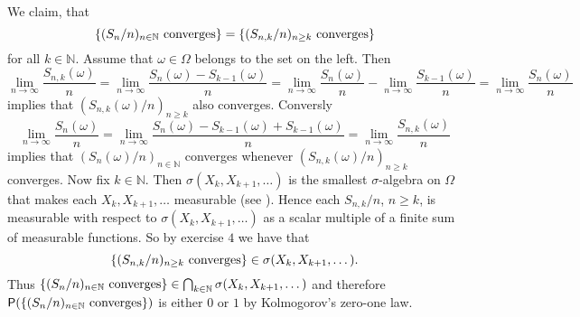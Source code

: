 \begin{enumerate}[label = \textbf{Exercise \arabic*.},wide = 0pt, itemsep=1.5ex]
		We claim, that
		\begin{equation}
			\cbr[0]{(S_n/n)_{n \in \mathbb{N}} \text{ converges}} = \cbr[0]{(S_{n,k}/n)_{n \geq k} \text{ converges}}
		\end{equation}
		\noindent for all $k \in \mathbb{N}$. Assume that $\omega \in \Omega$ belongs to the set on the left. Then
		\begin{equation}
			\lim_{n \to \infty}\frac{S_{n,k}(\omega)}{n} = \lim_{n \to \infty}\frac{S_n(\omega) - S_{k-1}(\omega)}{n} = \lim_{n \to \infty} \frac{S_n(\omega)}{n} - \lim_{n \to \infty} \frac{S_{k - 1}(\omega)}{n} = \lim_{n \to \infty}\frac{S_n(\omega)}{n} 
		\end{equation}
		\noindent implies that $(S_{n,k}(\omega)/n)_{n \geq k}$ also converges. Conversly
		\begin{equation}
			\lim_{n \to \infty}\frac{S_{n}(\omega)}{n} = \lim_{n \to \infty}\frac{S_n(\omega) - S_{k-1}(\omega) + S_{k -1}(\omega)}{n} = \lim_{n \to \infty} \frac{S_{n,k}(\omega)}{n} 
		\end{equation}
		\noindent implies that $(S_n(\omega)/n)_{n \in \mathbb{N}}$ converges whenever $(S_{n,k}(\omega)/n)_{n \geq k}$ converges. Now fix $k \in \mathbb{N}$. Then $\sigma(X_k,X_{k + 1},\dots)$ is the smallest $\sigma$-algebra on $\Omega$ that makes each $X_k,X_{k + 1},\dots$ measurable (see \cite[309]{cohn:measure_theory:2013}). Hence each $S_{n,k}/n$, $n \geq k$, is measurable with respect to $\sigma(X_k,X_{k + 1},\dots)$ as a scalar multiple of a finite sum of measurable functions. So by exercise $4$ \cite[49]{cohn:measure_theory:2013} we have that
		\begin{equation}
			\cbr[0]{(S_{n,k}/n)_{n \geq k} \text{ converges}} \in \sigma(X_k,X_{k + 1},\dots).
		\end{equation}
		Thus $\cbr[0]{(S_n/n)_{n \in \mathbb{N}} \text{ converges}} \in \bigcap_{k \in \mathbb{N}} \sigma(X_k,X_{k + 1},\dots)$ and therefore $\Psf(\cbr[0]{(S_n/n)_{n \in \mathbb{N}} \text{ converges}})$ is either $0$ or $1$ by Kolmogorov's zero-one law.


\end{enumerate}
\printbibliography

